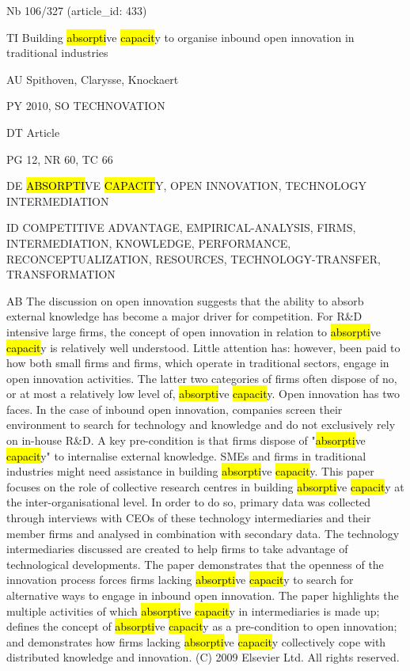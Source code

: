 \documentclass[a4paper]{article}
\begin{document}
\vspace*{-2cm}
Nb \tabto{0cm}106/327 (article\_id: 433)\par
TI \tabto{0cm}Building \hl{absorpti}ve \hl{capacit}y to organise inbound open innovation in traditional industries\par
AU \tabto{0cm}Spithoven, Clarysse, Knockaert\par
PY \tabto{0cm}2010, SO TECHNOVATION\par
DT \tabto{0cm}Article\par
PG \tabto{0cm}12, NR 60, TC 66\par
DE \tabto{0cm}\hl{ABSORPTI}VE \hl{CAPACIT}Y, OPEN INNOVATION, TECHNOLOGY INTERMEDIATION\par
ID \tabto{0cm}COMPETITIVE ADVANTAGE, EMPIRICAL-ANALYSIS, FIRMS, INTERMEDIATION, KNOWLEDGE, PERFORMANCE, RECONCEPTUALIZATION, RESOURCES, TECHNOLOGY-TRANSFER, TRANSFORMATION\par
AB \tabto{0cm}The discussion on open innovation suggests that the ability to absorb external knowledge has become a major driver for competition. For R\&D intensive large firms, the concept of open innovation in relation to \hl{absorpti}ve \hl{capacit}y is relatively well understood. Little attention has: however, been paid to how both small firms and firms, which operate in traditional sectors, engage in open innovation activities. The latter two categories of firms often dispose of no, or at most a relatively low level of, \hl{absorpti}ve \hl{capacit}y. Open innovation has two faces. In the case of inbound open innovation, companies screen their environment to search for technology and knowledge and do not exclusively rely on in-house R\&D. A key pre-condition is that firms dispose of "\hl{absorpti}ve \hl{capacit}y" to internalise external knowledge. SMEs and firms in traditional industries might need assistance in building \hl{absorpti}ve \hl{capacit}y. This paper focuses on the role of collective research centres in building \hl{absorpti}ve \hl{capacit}y at the inter-organisational level. In order to do so, primary data was collected through interviews with CEOs of these technology intermediaries and their member firms and analysed in combination with secondary data. The technology intermediaries discussed are created to help firms to take advantage of technological developments. The paper demonstrates that the openness of the innovation process forces firms lacking \hl{absorpti}ve \hl{capacit}y to search for alternative ways to engage in inbound open innovation. The paper highlights the multiple activities of which \hl{absorpti}ve \hl{capacit}y in intermediaries is made up; defines the concept of \hl{absorpti}ve \hl{capacit}y as a pre-condition to open innovation; and demonstrates how firms lacking \hl{absorpti}ve \hl{capacit}y collectively cope with distributed knowledge and innovation. (C) 2009 Elsevier Ltd. All rights reserved.\par
\clearpage
\end{document}
